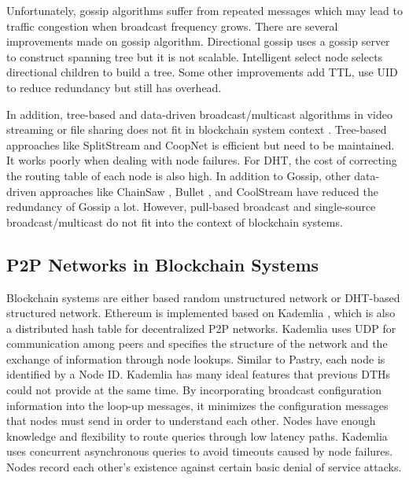 Unfortunately, gossip algorithms suffer from repeated messages which may lead to traffic congestion when broadcast frequency grows. There are several improvements made on gossip algorithm. Directional gossip uses a gossip server to construct spanning tree but it is not scalable. Intelligent select node selects directional children to build a tree. Some other improvements add TTL, use UID to reduce redundancy but still has overhead.

In addition, tree-based and data-driven broadcast/multicast algorithms in video streaming or file sharing does not fit in blockchain system context \cite{liu2008opportunities}. Tree-based approaches like SplitStream \cite{castro2003splitstream} and CoopNet \cite{padmanabhan2002distributing} is efficient but need to be maintained. It works poorly when dealing with node failures. For DHT, the cost of correcting the routing table of each node is also high. In addition to Gossip, other data-driven approaches like ChainSaw \cite{pai2005chainsaw}, Bullet \cite{kostic2003bullet}, and CoolStream \cite{zhang2005coolstreaming} have reduced the redundancy of Gossip a lot. However, pull-based broadcast and single-source broadcast/multicast do not fit into the context of blockchain systems.

\subsection{P2P Networks in Blockchain Systems}

Blockchain systems are either based random unstructured network or DHT-based structured network. Ethereum is implemented based on Kademlia \cite{maymounkov2002kademlia}, which is also a distributed hash table for decentralized P2P networks. Kademlia uses UDP for communication among peers and specifies the structure of the network and the exchange of information through node lookups. Similar to Pastry, each node is identified by a Node ID. Kademlia has many ideal features that previous DTHs could not provide at the same time. By incorporating broadcast configuration information into the loop-up messages, it minimizes the configuration messages that nodes must send in order to understand each other. Nodes have enough knowledge and flexibility to route queries through low latency paths. Kademlia uses concurrent asynchronous queries to avoid timeouts caused by node failures. Nodes record each other's existence against certain basic denial of service attacks.

